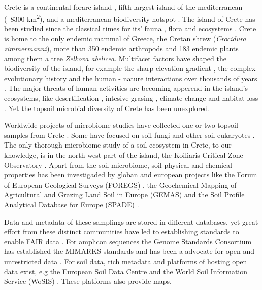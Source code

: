 \documentclass[unnumsec,webpdf,contemporary,large]{oup-authoring-template}%
\theoremstyle{thmstyleone}%
\theoremstyle{thmstyletwo}%
\theoremstyle{thmstylethree}%
\begin{document}
Crete is a continental forarc island \cite{ali2016}, fifth largest island of the mediterranean (~8300 km\textsuperscript{2}),
and a mediterranean biodiversity hotspot \cite{myers2000biodiversity}.
The island of Crete has been studied since the classical times for its'
fauna \cite{Sidiropoulos_Polymeni_Legakis_2017,Anastasiou2018Tenebrionid}, flora \cite{Krimbas_2005} and ecosystems \cite{Grove1993}.
Crete is home to the only endemic mammal of Greece, the Cretan shrew (\textit{Crocidura zimmermanni}),
more than 350 endemic arthropods \cite{bolanakis2024} and 183 endemic plants \cite{Kougioumoutzis2020}
among them a tree \textit{Zelkova abelicea}. Multifacet factors have shaped the
biodiversity of the island, for example the sharp elevation gradient \cite{trigas2013, FAZAN2017},
the complex evolutionary history \cite{POULAKAKIS2002} and the human - nature
interactions over thousands of years \cite{Vogiatzakis2008_med, Sfenthourakis2017}.
The major threats of human activities are becoming apperend in the island's ecosystems,
like desertification \cite{KARAMESOUTI2018266}, intesive grasing \cite{JouffroyBapicot2016},
climate change \cite{Kougioumoutzis2020,Vogiatzakis2016} and habitat loss \cite{ISPIKOUDIS1993259}.
Yet the topsoil microbial diversity of Crete has been unexplored.

Worldwide projects of microbiome studies have collected one or two topsoil
samples from Crete \cite{Vasar2022, Labouyrie2023, Bahram2018, Orgiazzi2018}.
Some have focused on soil fungi \cite{Mikryukov2023, Davison2021, Tedersoo2021}
and other soil eukaryotes \cite{Aslani2022}.
The only thorough microbiome study of a soil ecosystem in Crete, to our knowledge,
is in the north west part of the island, the Koiliaris Critical Zone Observatory \cite{tsiknia2014}.
Apart from the soil microbiome, soil physical and chemical properties has been
investigaded by globan and european projects like the Forum of European Geological Surveys
(FOREGS) \cite{nerc19017}, the Geochemical Mapping of Agricultural and Grazing Land
Soil in Europe (GEMAS) \cite{REIMANN2018302} and the Soil Profile Analytical
Database for Europe (SPADE) \cite{Hiederer2006}.

Data and metadata of these samplings are stored in different databases, yet 
great effort from these distinct communities have led to establishing standards
to enable FAIR data \cite{Wilkinson2016}. For amplicon sequences the Genome Standards
Consortium \cite{Field2011} has established the MIMARKS \cite{yilmaz2011minimum}
standards and has been a advocate for open and unrestricted data \cite{Amann2019}.
For soil data, rich metadata and platforms of hosting open data exist, e.g the 
European Soil Data Centre \cite{Panagos2022} and the World Soil Information
Service (WoSIS) \cite{Batjes2024}. These platforms also provide maps.
\end{document}
